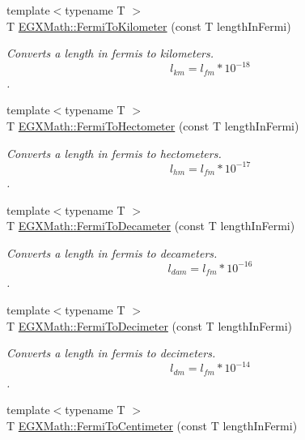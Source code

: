 \begin{DoxyCompactItemize}
{\footnotesize template$<$typename T $>$ }\\T \mbox{\hyperlink{group___e_g_x_math-_conversions-_length_conversions-_non-_s_i-_fermi-_s_i_ga9401eb4ce5a32e0c67244eba800b1fd4}{E\+G\+X\+Math\+::\+Fermi\+To\+Kilometer}} (const T length\+In\+Fermi)
\begin{DoxyCompactList}\small\item\em Converts a length in fermis to kilometers. \[ l_{km}=l_{fm} * 10^{-18} \]. \end{DoxyCompactList}\item 
{\footnotesize template$<$typename T $>$ }\\T \mbox{\hyperlink{group___e_g_x_math-_conversions-_length_conversions-_non-_s_i-_fermi-_s_i_ga0412e30a3ebf380fdde7f67793d35ebd}{E\+G\+X\+Math\+::\+Fermi\+To\+Hectometer}} (const T length\+In\+Fermi)
\begin{DoxyCompactList}\small\item\em Converts a length in fermis to hectometers. \[ l_{hm}=l_{fm} * 10^{-17} \]. \end{DoxyCompactList}\item 
{\footnotesize template$<$typename T $>$ }\\T \mbox{\hyperlink{group___e_g_x_math-_conversions-_length_conversions-_non-_s_i-_fermi-_s_i_ga7119536a4a74664e533c6bdfa1deba71}{E\+G\+X\+Math\+::\+Fermi\+To\+Decameter}} (const T length\+In\+Fermi)
\begin{DoxyCompactList}\small\item\em Converts a length in fermis to decameters. \[ l_{dam}=l_{fm} * 10^{-16} \]. \end{DoxyCompactList}\item 
{\footnotesize template$<$typename T $>$ }\\T \mbox{\hyperlink{group___e_g_x_math-_conversions-_length_conversions-_non-_s_i-_fermi-_s_i_ga2cfa1fa15a1113ea5eb214a6954240a9}{E\+G\+X\+Math\+::\+Fermi\+To\+Decimeter}} (const T length\+In\+Fermi)
\begin{DoxyCompactList}\small\item\em Converts a length in fermis to decimeters. \[ l_{dm}=l_{fm} * 10^{-14} \]. \end{DoxyCompactList}\item 
{\footnotesize template$<$typename T $>$ }\\T \mbox{\hyperlink{group___e_g_x_math-_conversions-_length_conversions-_non-_s_i-_fermi-_s_i_ga3de937db3dd4286efef9b68128eae2ad}{E\+G\+X\+Math\+::\+Fermi\+To\+Centimeter}} (const T length\+In\+Fermi)

\end{DoxyCompactItemize}
